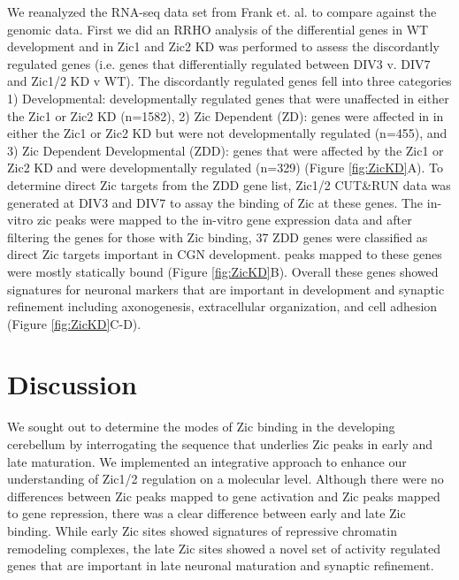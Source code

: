 \documentclass[fleqn,10pt]{wlscirep}
\begin{document}

We reanalyzed the RNA-seq data set from Frank et. al. \cite{Frank2015RegulationCerebellum} to compare against the genomic data. First we did an RRHO analysis of the differential genes in WT development and in Zic1 and Zic2 KD was performed to assess the discordantly regulated genes (i.e. genes that differentially regulated between DIV3 v. DIV7 and Zic1/2 KD v WT). The discordantly regulated genes fell into three categories 1) Developmental: developmentally regulated genes that were unaffected in either the Zic1 or Zic2 KD (n=1582), 2) Zic Dependent (ZD): genes were affected in in either the Zic1 or Zic2 KD but were not developmentally regulated (n=455), and 3) Zic Dependent Developmental (ZDD): genes that were affected by the Zic1 or Zic2 KD and were developmentally regulated (n=329) (Figure \ref{fig:ZicKD}A). To determine direct Zic targets from the ZDD gene list, Zic1/2 CUT&RUN data was generated at DIV3 and DIV7 to assay the binding of Zic at these genes. The in-vitro zic peaks were mapped to the in-vitro gene expression data and  after filtering the genes for those with Zic binding, 37 ZDD genes were classified as direct Zic targets important in CGN development. peaks mapped to these genes were mostly statically bound (Figure \ref{fig:ZicKD}B). Overall these genes showed signatures for neuronal markers that are important in development and synaptic refinement including axonogenesis, extracellular organization, and cell adhesion (Figure \ref{fig:ZicKD}C-D). 

\section*{Discussion}
We sought out to determine the modes of Zic binding in the developing cerebellum by interrogating the sequence that underlies Zic peaks in early and late maturation. We implemented an integrative approach to enhance our understanding of Zic1/2 regulation on a molecular level. Although there were no differences between Zic peaks mapped to gene activation and Zic peaks mapped to gene repression, there was a clear difference between early and late Zic binding. While early Zic sites showed signatures of repressive chromatin remodeling complexes, the late Zic sites showed a novel set of activity regulated genes that are important in late neuronal maturation and synaptic refinement. 
\end{document}
